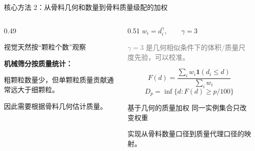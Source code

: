 \documentclass[UTF8,aspectratio=169,11pt]{ctexbeamer}
\newcommand{\smallgray}[1]{{\scriptsize\textcolor{gray}{#1}}}
\begin{document}
\begin{frame}{核心方法 2：从骨料几何和数量到骨料质量级配的加权}
\begin{columns}[T]
\begin{column}{0.49\textwidth}
\begin{block}{视觉天然按“颗粒个数”观察}
\centering
{}
\end{block}
\footnotesize
\textbf{机械筛分按质量统计：}

粗颗粒数量少，但单颗粒质量贡献通常远大于细颗粒。

因此需要根据骨料几何估计质量。
\end{column}
\begin{column}{0.51\textwidth}
\centering
{\large $w_i=d_i^{\gamma},\qquad \gamma=3$}
\vspace{0.15em}

\smallgray{$\gamma=3$ 是几何相似条件下的体积/质量尺度先验，可以校准。}
\vspace{0.2em}

{\small\[
F(d)=\frac{\sum_i w_i\mathbf{1}(d_i\le d)}{\sum_i w_i}
\]
\[
D_p=\inf\{d:F(d)\ge p/100\}
\]}
\vspace{0.1em}
\begin{alertblock}{基于几何的质量加权}
\footnotesize 同一实例集合只改变权重

实现从骨料数量口径到质量代理口径的映射。
\end{alertblock}
\end{column}
\end{columns}
\end{frame}
\end{document}
